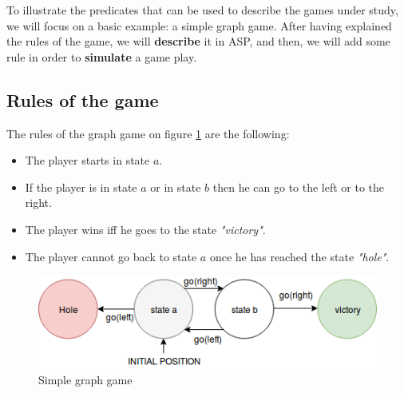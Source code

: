\smallskip

To illustrate the predicates that can be used to describe the games under study, we will focus on a basic example: a simple graph game. After having explained the rules of the game, we will \textbf{describe} it in ASP, and then, we will add some rule in order to \textbf{simulate} a game play.

\subsection{Rules of the game}

The rules of the graph game on figure \ref{fig:agent} are the following:
\begin{itemize}
\item The player starts in state $a$.
\item If the player is in state $a$ or in state $b$ then he can go to the left or to the right.
\item The player wins iff he goes to the state \textit{"victory"}.
\item The player cannot go back to state $a$ once he has reached the state \textit{"hole"}.
\end{itemize}

\begin{figure}[h]
\centering
\includegraphics[width = 0.8\hsize]{figures/diagram1.png}
\caption{Simple graph game}
\label{fig:agent}
\end{figure}

